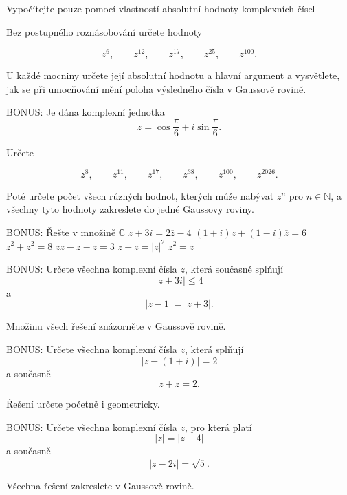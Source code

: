 \begin{exerciseblock}[2]{Vypočítejte pouze pomocí vlastností absolutní hodnoty komplexních čísel}
\begin{exercise}
{Bez postupného roznásobování určete hodnoty

\[
    z^6,\qquad
    z^{12},\qquad
    z^{17},\qquad
    z^{25},\qquad
    z^{100}.
\]

U každé mocniny určete její absolutní hodnotu a hlavní argument a vysvětlete,
jak se při umocňování mění poloha výsledného čísla v Gaussově rovině.
}
\end{exercise}


\begin{exercise}{BONUS: Je dána komplexní jednotka
\[
    z=
    \cos\frac{\pi}{6}
    +
    i\sin\frac{\pi}{6}.
\]

Určete

\[
    z^8,\qquad
    z^{11},\qquad
    z^{17},\qquad
    z^{38},\qquad
    z^{100},\qquad
    z^{2026}.
\]

Poté určete počet všech různých hodnot, kterých může nabývat $z^n$ pro
$n\in\mathbb{N}$, a všechny tyto hodnoty zakreslete do jedné Gaussovy roviny.
}
\end{exercise}



\begin{exerciseblock}[2]{BONUS: Řešte v množině $\mathbb{C}$}
    \task $z+3i=2\overline z-4$
    \task $(1+i)z+(1-i)\overline z=6$
    \task $z^2+\overline z^2=8$
    \task $z\overline z-z-\overline z=3$
    \task $z+\overline z=|z|^2$
    \task $z^2=\overline z$
\end{exerciseblock}



\begin{exercise}{BONUS: Určete všechna komplexní čísla $z$, která současně splňují
\[
    |z+3i|\leq4
\]
a
\[
    |z-1|=|z+3|.
\]

Množinu všech řešení znázorněte v Gaussově rovině.
}
\end{exercise}


\begin{exercise}{BONUS: Určete všechna komplexní čísla $z$, která splňují
\[
    |z-(1+i)|=2
\]
a současně
\[
    z+\overline z=2.
\]

Řešení určete početně i geometricky.
}
\end{exercise}


\begin{exercise}{BONUS: Určete všechna komplexní čísla $z$, pro která platí
\[
    |z|=|z-4|
\]
a současně
\[
    |z-2i|=\sqrt5.
\]

Všechna řešení zakreslete v Gaussově rovině.
}
\end{exercise}



\end{exerciseblock}
